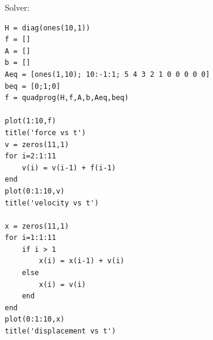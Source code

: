 \documentclass[12pt,letter]{article}
\begin{document}
\begin{enumerate}
\begin{itemize}
    Solver:
\begin{verbatim}
H = diag(ones(10,1))
f = []
A = []
b = []
Aeq = [ones(1,10); 10:-1:1; 5 4 3 2 1 0 0 0 0 0]
beq = [0;1;0]
f = quadprog(H,f,A,b,Aeq,beq)

plot(1:10,f)
title('force vs t')
v = zeros(11,1)
for i=2:1:11
    v(i) = v(i-1) + f(i-1)
end
plot(0:1:10,v)
title('velocity vs t')

x = zeros(11,1)
for i=1:1:11
    if i > 1
        x(i) = x(i-1) + v(i)
    else
        x(i) = v(i)
    end
end
plot(0:1:10,x)
title('displacement vs t')
\end{verbatim}

  \end{itemize}
\end{enumerate}
\end{document}
